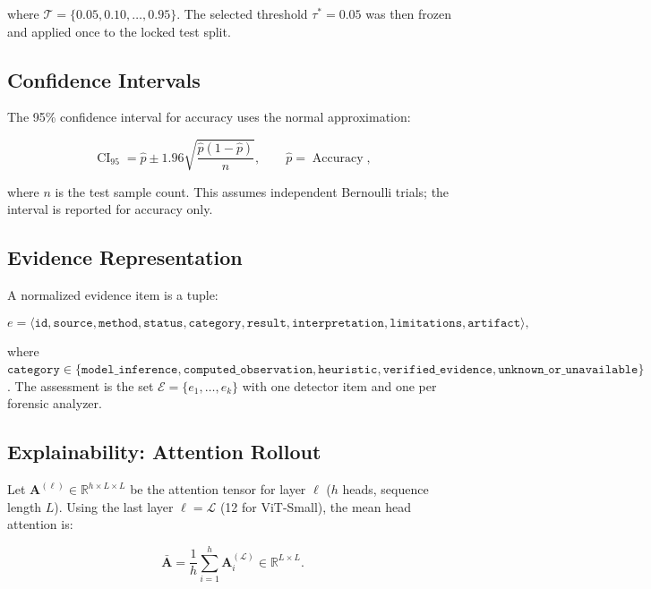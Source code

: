 \documentclass[10pt,conference,compsoc]{IEEEtran}
\begin{document}
where $\mathcal{T} = \{0.05, 0.10, \dots, 0.95\}$.
The selected threshold $\tau^* = 0.05$ was then frozen and applied once to the locked test split.

\subsection{Confidence Intervals}
\label{sec:math-ci}

The 95\% confidence interval for accuracy uses the normal approximation:

\begin{equation}
\operatorname{CI}_{95} = \hat{p} \pm 1.96 \sqrt{\frac{\hat{p}(1-\hat{p})}{n}},
\qquad \hat{p} = \operatorname{Accuracy},
\label{eq:ci}
\end{equation}

where $n$ is the test sample count. This assumes independent Bernoulli trials; the interval is reported for accuracy only.

\subsection{Evidence Representation}
\label{sec:math-evidence}

A normalized evidence item is a tuple:

\begin{equation}
e = \langle \texttt{id}, \texttt{source}, \texttt{method}, \texttt{status},
\texttt{category}, \texttt{result}, \texttt{interpretation}, \texttt{limitations}, \texttt{artifact} \rangle,
\label{eq:evidence}
\end{equation}

where $\texttt{category} \in \{\texttt{model\_inference}, \texttt{computed\_observation},
\texttt{heuristic}, \texttt{verified\_evidence}, \texttt{unknown\_or\_unavailable}\}$.
The assessment is the set $\mathcal{E} = \{e_1, \dots, e_k\}$ with one detector item and one per forensic analyzer.

\subsection{Explainability: Attention Rollout}
\label{sec:math-explainability}

Let $\mathbf{A}^{(\ell)} \in \mathbb{R}^{h \times L \times L}$ be the attention tensor for layer $\ell$ ($h$ heads, sequence length $L$).
Using the last layer $\ell = \mathcal{L}$ (12 for ViT-Small), the mean head attention is:

\begin{equation}
\bar{\mathbf{A}} = \frac{1}{h} \sum_{i=1}^h \mathbf{A}^{(\mathcal{L})}_i \in \mathbb{R}^{L \times L}.
\label{eq:mean-head}
\end{equation}
\end{document}
